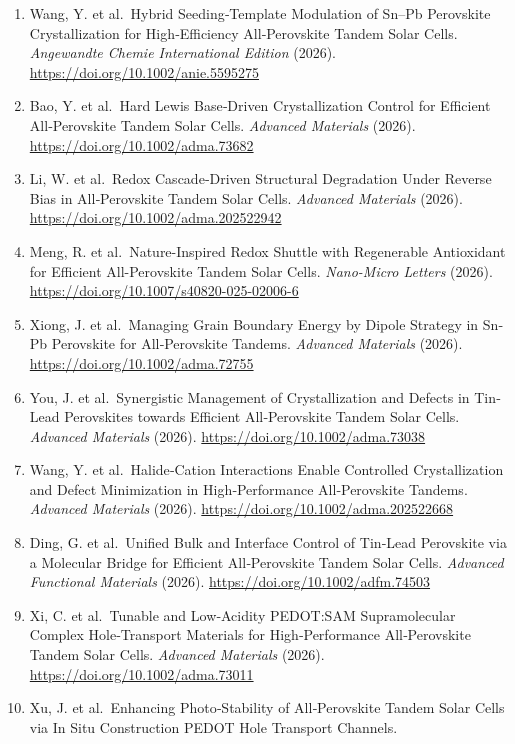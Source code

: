 \documentclass[
  11pt,
]{article}
\begin{document}
\begin{enumerate}
  \url{https://doi.org/10.1021/acsenergylett.6c00617}
\item
  Wang, Y. et al.~Hybrid Seeding‐Template Modulation of Sn--Pb
  Perovskite Crystallization for High‐Efficiency All‐Perovskite Tandem
  Solar Cells. \emph{Angewandte Chemie International Edition} (2026).
  \url{https://doi.org/10.1002/anie.5595275}
\item
  Bao, Y. et al.~Hard Lewis Base‐Driven Crystallization Control for
  Efficient All‐Perovskite Tandem Solar Cells. \emph{Advanced Materials}
  (2026). \url{https://doi.org/10.1002/adma.73682}
\item
  Li, W. et al.~Redox Cascade‐Driven Structural Degradation Under
  Reverse Bias in All‐Perovskite Tandem Solar Cells. \emph{Advanced
  Materials} (2026). \url{https://doi.org/10.1002/adma.202522942}
\item
  Meng, R. et al.~Nature-Inspired Redox Shuttle with Regenerable
  Antioxidant for Efficient All-Perovskite Tandem Solar Cells.
  \emph{Nano-Micro Letters} (2026).
  \url{https://doi.org/10.1007/s40820-025-02006-6}
\item
  Xiong, J. et al.~Managing Grain Boundary Energy by Dipole Strategy in
  Sn‐Pb Perovskite for All‐Perovskite Tandems. \emph{Advanced Materials}
  (2026). \url{https://doi.org/10.1002/adma.72755}
\item
  You, J. et al.~Synergistic Management of Crystallization and Defects
  in Tin‐Lead Perovskites towards Efficient All‐Perovskite Tandem Solar
  Cells. \emph{Advanced Materials} (2026).
  \url{https://doi.org/10.1002/adma.73038}
\item
  Wang, Y. et al.~Halide‐Cation Interactions Enable Controlled
  Crystallization and Defect Minimization in High‐Performance
  All‐Perovskite Tandems. \emph{Advanced Materials} (2026).
  \url{https://doi.org/10.1002/adma.202522668}
\item
  Ding, G. et al.~Unified Bulk and Interface Control of Tin‐Lead
  Perovskite via a Molecular Bridge for Efficient All‐Perovskite Tandem
  Solar Cells. \emph{Advanced Functional Materials} (2026).
  \url{https://doi.org/10.1002/adfm.74503}
\item
  Xi, C. et al.~Tunable and Low‐Acidity PEDOT:SAM Supramolecular Complex
  Hole‐Transport Materials for High‐Performance All‐Perovskite Tandem
  Solar Cells. \emph{Advanced Materials} (2026).
  \url{https://doi.org/10.1002/adma.73011}
\item
  Xu, J. et al.~Enhancing Photo‐Stability of All‐Perovskite Tandem Solar
  Cells via In Situ Construction PEDOT Hole Transport Channels.

\end{enumerate}
\end{document}
